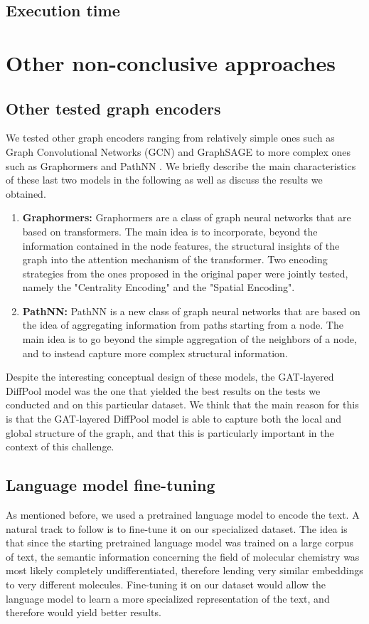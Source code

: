 \documentclass[switch, 12pt]{article}
\begin{document}
\begin{multicols}{2}
    \subsection{Execution time}

    \section{Other non-conclusive approaches}
    \label{sec:non-conclusive}
    \subsection{Other tested graph encoders}
    We tested other graph encoders ranging from relatively simple ones such as Graph Convolutional Networks (GCN) \cite{gcn}  and GraphSAGE \cite{graphsage} to more complex ones such as Graphormers \cite{graphormers} and PathNN \cite{pathnn}. We briefly describe the main characteristics of these last two models in the following as well as discuss the results we obtained.
    \begin{enumerate}
        \item \textbf{Graphormers: } Graphormers are a class of graph neural networks that are based on transformers. The main idea is to incorporate, beyond the information contained in the node features,  the structural insights of the graph into the attention mechanism of the transformer. Two encoding strategies from the ones proposed in the original paper \cite{graphormers} were jointly tested, namely the "Centrality Encoding" and the "Spatial Encoding".
        \item \textbf{PathNN: } PathNN \cite{pathnn} is a new class of graph neural networks that are based on the idea of aggregating information from paths starting from a node. The main idea is to go beyond the simple aggregation of the neighbors of a node, and to instead capture more complex structural information.
    \end{enumerate}
    Despite the interesting conceptual design of these models, the GAT-layered DiffPool model was the one that yielded the best results on the tests we conducted and on this particular dataset. We think that the main reason for this is that the GAT-layered DiffPool model is able to capture both the local and global structure of the graph, and that this is particularly important in the context of this challenge.
    \subsection{Language model fine-tuning}
    As mentioned before, we used a pretrained language model to encode the text. A natural track to follow is to fine-tune it on our specialized dataset. The idea is that since the starting pretrained language model was trained on a large corpus of text, the semantic information concerning the field of molecular chemistry was most likely completely undifferentiated, therefore lending very similar embeddings to very different molecules. Fine-tuning it on our dataset would allow the language model to learn a more specialized representation of the text, and therefore would yield better results.


\end{multicols}
\end{document}
